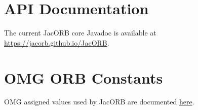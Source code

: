 

\section{API Documentation}

The current JacORB core Javadoc is available at \href{https://jacorb.github.io/JacORB}{https://jacorb.github.io/JacORB}.

\section{OMG ORB Constants}

OMG assigned values used by JacORB are documented \href{https://jacorb.github.io/JacORB/org/jacorb/orb/ORBConstants.html}{here}.

